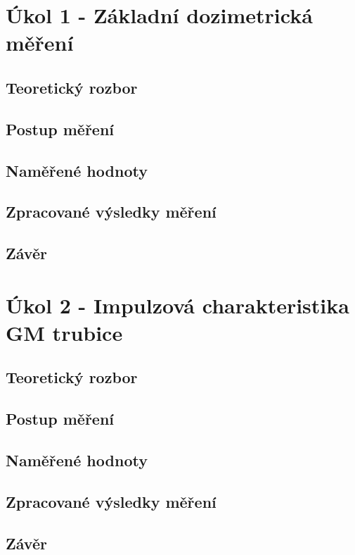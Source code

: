 \documentclass{protokol}
\begin{document}
\pagebreak 

\section{Úkol 1 - Základní dozimetrická měření}
    \subsection{Teoretický rozbor}
    \subsection{Postup měření}
    \subsection{Naměřené hodnoty}   
    \subsection{Zpracované výsledky měření}
    \subsection{Závěr}

\pagebreak

\section{Úkol 2 - Impulzová charakteristika GM trubice}
    \subsection{Teoretický rozbor}
    \subsection{Postup měření}
    \subsection{Naměřené hodnoty}   
    \subsection{Zpracované výsledky měření}
    \subsection{Závěr}

\pagebreak
\end{document}
